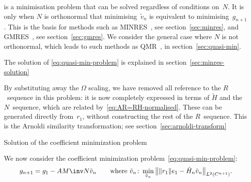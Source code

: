 \documentclass[11pt]{artikel3}
\begin{document}
\begin{Outline}
\begin{remark}
 is a minimisation problem
that can be solved
regardless of conditions on~$N$. It is only when $N$ is orthonormal
that minimising~$\tilde v_n$ is equivalent to minimising~$g_{n+1}$.
This is the basis for methods such as 
MINRES~\cite{PaSa:indefinite}, see section~\ref{sec:minres},
and GMRES~\cite{SaadSchultz:gmres}, see section~\ref{sec:gmres}.
We consider the general case where $N$ is not orthonormal,
which leads to such methods as QMR~\cite{FrNa:qmr},
in section~\ref{sec:quasi-min}.
\end{remark}

The solution of \eqref{eq:quasi-min-problem} is explained in
section~\ref{sec:minres-solution}

\begin{remark}\label{gmres-from-norm}
By substituting away the $\Omega$ scaling, we have removed
all reference to the $R$~sequence in this problem: it is now
completely expressed in terms of $\tilde H$ and the $N$~sequence,
which are related by~\eqref{eq:AR=RH-normalised}.
These can be generated directly from~$r_1$, without constructing
the rest of the $R$~sequence.
This is the Arnoldi similarity transformation;
see section~\ref{sec:arnoldi-transform}
\end{remark}

 {Solution of the coefficient minimization problem}
\label{sec:minres-solution}

We now consider the coefficient minimization
problem~\eqref{eq:quasi-min-problem}:
\[     g_{n+1}=g_1-AM\inv N\tilde v_n\qquad\hbox{where
    $\displaystyle \tilde v_n\colon\min_{\tilde v_n}\left\| \|r_1\|e_1 
    - \tilde H_n\tilde v_n \right\|_{L^2(C^{n+1})}$}. \]


\end{Outline}
\end{document}
